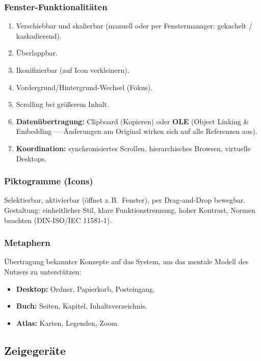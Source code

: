 \documentclass[12pt, a4paper]{article}
\begin{document}
\subsubsection*{Fenster-Funktionalitäten}
\begin{enumerate}
  \item Verschiebbar und skalierbar (manuell oder per Fenstermanager: gekachelt / kaskadierend).
  \item Überlappbar.
  \item Ikonifizierbar (auf Icon verkleinern).
  \item Vordergrund/Hintergrund-Wechsel (Fokus).
  \item Scrolling bei größerem Inhalt.
  \item \textbf{Datenübertragung:} Clipboard (Kopieren) oder \textbf{OLE} (Object Linking \& Embedding — Änderungen am Original wirken sich auf alle Referenzen aus).
  \item \textbf{Koordination:} synchronisiertes Scrollen, hierarchisches Browsen, virtuelle Desktops.
\end{enumerate}

\subsubsection*{Piktogramme (Icons)}

Selektierbar, aktivierbar (öffnet z.\,B.\ Fenster), per Drag-and-Drop bewegbar. Gestaltung: einheitlicher Stil, klare Funktionstrennung, hoher Kontrast, Normen beachten (DIN-ISO/IEC 11581-1).

\subsubsection*{Metaphern}

Übertragung bekannter Konzepte auf das System, um das mentale Modell des Nutzers zu unterstützen:
\begin{itemize}
  \item \textbf{Desktop:} Ordner, Papierkorb, Posteingang.
  \item \textbf{Buch:} Seiten, Kapitel, Inhaltsverzeichnis.
  \item \textbf{Atlas:} Karten, Legenden, Zoom.
\end{itemize}

\subsection{Zeigegeräte}
\end{document}
